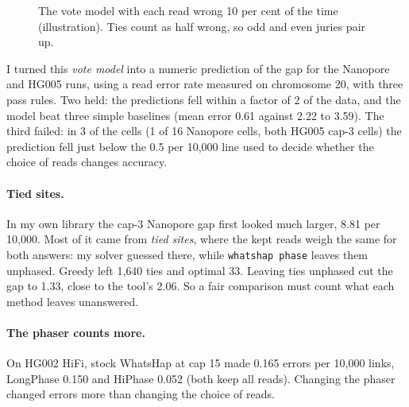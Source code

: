 \documentclass[11pt]{article}
\newcommand{\code}[1]{\texttt{#1}}
\begin{document}
\begin{figure}[h]
\centering
{}
\caption{The vote model with each read wrong 10 per cent of the time
(illustration). Ties count as half wrong, so odd and even juries pair up.}
\label{fig:jury}
\end{figure}

I turned this \emph{vote model} into a numeric prediction of the gap for
the Nanopore and HG005 runs, using a read error rate measured on chromosome
20, with three pass rules. Two held: the predictions fell within a factor of
2 of the data, and the model beat three simple baselines (mean error 0.61
against 2.22 to 3.59). The third failed: in 3 of the cells (1 of 16 Nanopore
cells, both HG005 cap-3 cells) the prediction fell just below the 0.5 per
10{,}000 line used to decide whether the choice of reads changes accuracy.

\paragraph{Tied sites.} In my own library the cap-3 Nanopore gap first
looked much larger, 8.81 per 10{,}000. Most of it came from \emph{tied
sites}, where the kept reads weigh the same for both answers: my solver
guessed there, while \code{whatshap phase} leaves them unphased. Greedy left
1{,}640 ties and optimal 33. Leaving ties unphased cut the gap to 1.33, close
to the tool's 2.06. So a fair comparison must count what each method leaves
unanswered.

\paragraph{The phaser counts more.} On HG002 HiFi, stock WhatsHap at cap 15
made 0.165 errors per 10{,}000 links, LongPhase 0.150 and HiPhase 0.052
(both keep all reads). Changing the phaser changed errors more than changing
the choice of reads.
\end{document}
